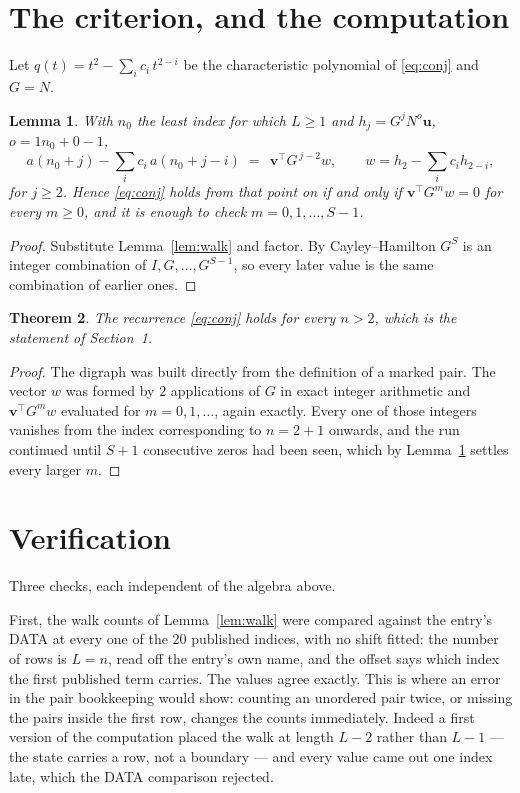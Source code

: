 \documentclass[11pt,a4paper]{article}
\theoremstyle{plain}
\newtheorem{theorem}{Theorem}
\newtheorem{lemma}[theorem]{Lemma}
\theoremstyle{definition}
\begin{document}
\section{The criterion, and the computation}

Let $q(t)=t^{2}-\sum_i c_i\,t^{2-i}$ be the characteristic polynomial of
\eqref{eq:conj} and $G=N$.

\begin{lemma}\label{lem:crit}
With $n_0$ the least index for which $L\ge1$ and $h_j=G^{j}N^{o}\mathbf{u}$,
$o=1n_0+0-1$,
\[
a(n_0+j)-\sum_i c_i\,a(n_0+j-i)\;=\;\,\mathbf{v}^{\!\top}G^{\,j-2}w,
\qquad w=h_{2}-\sum_i c_i h_{2-i},
\]
for $j\ge2$. Hence \eqref{eq:conj} holds from that point on if and only if
$\mathbf{v}^{\!\top}G^{m}w=0$ for every $m\ge0$, and it is enough to check
$m=0,1,\dots,S-1$.
\end{lemma}

\begin{proof}
Substitute Lemma~\ref{lem:walk} and factor. By Cayley--Hamilton $G^{S}$ is an integer
combination of $I,G,\dots,G^{S-1}$, so every later value is the same combination of earlier
ones.
\end{proof}

\begin{theorem}
The recurrence \eqref{eq:conj} holds for every $n>2$, which is the statement of
Section~1.
\end{theorem}

\begin{proof}
The digraph was built directly from the definition of a marked pair. The vector $w$ was
formed by $2$ applications of $G$ in exact integer arithmetic and
$\mathbf{v}^{\!\top}G^{m}w$ evaluated for $m=0,1,\dots$, again exactly. Every one of
those integers vanishes from the index corresponding to $n=2+1$ onwards, and the run
continued until $S+1$ consecutive zeros had been seen, which by Lemma~\ref{lem:crit}
settles every larger $m$.
\end{proof}

\section{Verification}

Three checks, each independent of the algebra above.

First, the walk counts of Lemma~\ref{lem:walk} were compared against the entry's DATA at
every one of the $20$ published indices, with no shift fitted: the number of rows is
$L=n$, read off the entry's own name, and the offset says which index the first
published term carries. The values agree exactly. This is where an error in the pair
bookkeeping would show: counting an unordered pair twice, or missing the pairs inside the
first row, changes the counts immediately. Indeed a first version of the computation
placed the walk at length $L-2$ rather than $L-1$ --- the state carries a row, not a
boundary --- and every value came out one index late, which the DATA comparison rejected.
\end{document}
